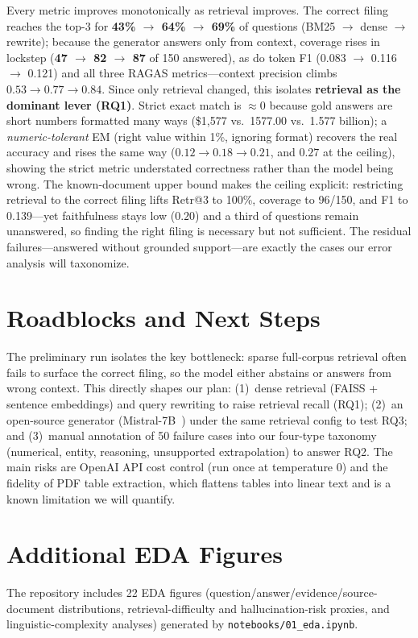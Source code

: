 \documentclass[11pt]{article}
\begin{document}
Every metric improves monotonically as retrieval improves. The correct filing reaches
the top-3 for \textbf{43\% $\rightarrow$ 64\% $\rightarrow$ 69\%} of questions
(BM25 $\rightarrow$ dense $\rightarrow$ rewrite); because the generator answers only
from context, coverage rises in lockstep (\textbf{47 $\rightarrow$ 82 $\rightarrow$ 87}
of 150 answered), as do token F1 (0.083 $\rightarrow$ 0.116 $\rightarrow$ 0.121) and all
three RAGAS metrics---context precision climbs $0.53 \rightarrow 0.77 \rightarrow 0.84$.
Since only retrieval changed, this isolates \textbf{retrieval as the dominant lever
(RQ1)}. Strict exact match is $\approx$0 because gold answers are short numbers formatted
many ways (\$1{,}577 vs.\ 1577.00 vs.\ 1.577 billion); a \emph{numeric-tolerant} EM
(right value within 1\%, ignoring format) recovers the real accuracy and rises the same
way ($0.12 \rightarrow 0.18 \rightarrow 0.21$, and $0.27$ at the ceiling), showing the
strict metric understated correctness rather than the model being wrong.
The known-document upper bound makes the ceiling explicit: restricting retrieval
to the correct filing lifts Retr@3 to 100\%, coverage to 96/150, and F1 to 0.139---yet
faithfulness stays low ($0.20$) and a third of questions remain unanswered, so finding
the right filing is necessary but not sufficient. The residual failures---answered
without grounded support---are exactly the cases our error analysis will taxonomize.

\section{Roadblocks and Next Steps}
\label{sec:next}
The preliminary run isolates the key bottleneck: sparse full-corpus retrieval
often fails to surface the correct filing, so the model either abstains or
answers from wrong context. This directly shapes our plan: (1)~dense retrieval
(FAISS + sentence embeddings) and query rewriting to raise retrieval recall
(RQ1); (2)~an open-source generator (Mistral-7B~\citep{jiang2023mistral}) under
the same retrieval config to test RQ3; and (3)~manual annotation of 50 failure
cases into our four-type taxonomy (numerical, entity, reasoning, unsupported
extrapolation) to answer RQ2. The main risks are OpenAI API cost control (run
once at temperature 0) and the fidelity of PDF table extraction, which flattens
tables into linear text and is a known limitation we will quantify.




\appendix
\section{Additional EDA Figures}
The repository includes 22 EDA figures (question/answer/evidence/source-document
distributions, retrieval-difficulty and hallucination-risk proxies, and
linguistic-complexity analyses) generated by \texttt{notebooks/01\_eda.ipynb}.
\end{document}
